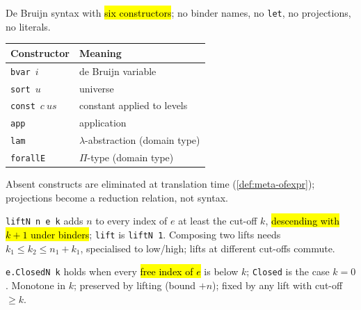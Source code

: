 \begin{definition}
\label{ind:vexpr}
\leanok
{}

 De Bruijn syntax with \hl{six constructors}; no binder names, no
\texttt{let}, no projections, no literals.
\par\smallskip\noindent
\begin{tabular}{ll}
\toprule
Constructor & Meaning \\
\midrule
\texttt{bvar}\ $i$ & de Bruijn variable \\
\texttt{sort}\ $u$ & universe \\
\texttt{const}\ $c\ us$ & constant applied to levels \\
\texttt{app} & application \\
\texttt{lam} & $\lambda$-abstraction (domain type) \\
\texttt{forallE} & $\Pi$-type (domain type) \\
\bottomrule
\end{tabular}\par\smallskip
{} Absent constructs are eliminated at translation time
(\ref{def:meta-ofexpr}); projections become a reduction relation, not syntax.
\end{definition}

\begin{definition}
\label{def:liftn}
\leanok
{}

 \texttt{liftN n e k} adds $n$ to every index of $e$ at least the cut-off
$k$, \hl{descending with $k+1$ under binders}; \texttt{lift} is \texttt{liftN 1}.
Composing two lifts needs $k_1 \le k_2 \le n_1+k_1$, specialised to low/high; lifts
at different cut-offs commute.
\end{definition}

\begin{definition}
\label{def:closedn}
\leanok
{}

 \texttt{e.ClosedN k} holds when every \hl{free index of $e$} is below $k$;
\texttt{Closed} is the case $k=0$.
Monotone in $k$; preserved by lifting (bound $+n$); fixed by any lift with cut-off
$\ge k$.
\end{definition}

